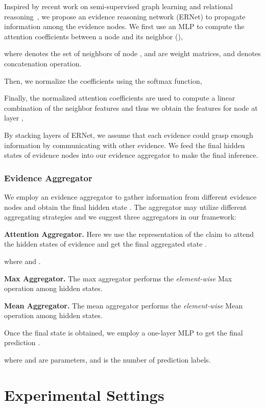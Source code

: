 \documentclass[11pt,a4paper]{article}
\begin{document}
Inspired by recent work on semi-supervised graph learning and relational reasoning~\cite{kipf2016semi,velickovic2017graph, palm2018recurrent}, we propose an evidence reasoning network (ERNet) to propagate information among the evidence nodes. We first use an MLP to compute the attention coefficients between a node  and its neighbor  (),

where  denotes the set of neighbors of node ,  and  are weight matrices, and  denotes concatenation operation.

Then, we normalize the coefficients using the softmax function,


Finally, the normalized attention coefficients are used to compute a linear combination of the neighbor features and thus we obtain the features for node  at layer ,


By stacking  layers of ERNet, we assume that each evidence could grasp enough information by communicating with other evidence. We feed the final hidden states of evidence nodes  into our evidence aggregator to make the final inference.

\subsubsection*{Evidence Aggregator}
We employ an evidence aggregator to gather information from different evidence nodes and obtain the final hidden state . The aggregator may utilize different aggregating strategies and we suggest three aggregators in our framework:

\textbf{Attention Aggregator.} Here we use the representation of the claim  to attend the hidden states of evidence and get the final aggregated state . 
	
where  and .

\textbf{Max Aggregator.} The max aggregator performs the \emph{element-wise} Max operation among hidden states.
	

\textbf{Mean Aggregator.} The mean aggregator performs the \emph{element-wise} Mean operation among hidden states.
	
	
Once the final state  is obtained, we employ a one-layer MLP to get the final prediction .

where  and  are parameters, and  is the number of prediction labels.

\section{Experimental Settings}
\end{document}
